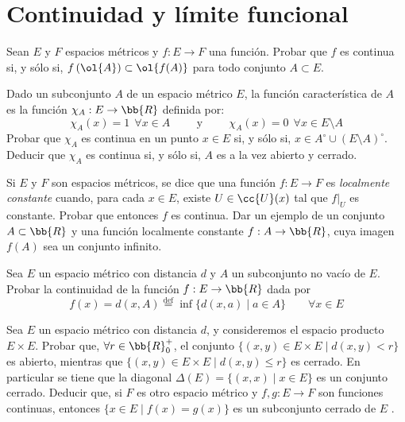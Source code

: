 \section{Continuidad y límite funcional}

\begin{ejercicio}
    Sean $E$ y $F$ espacios métricos y $f:E\to F$ una función. Probar que $f$ es continua si, y sólo si, $f\left(\ol{A}\right)\subset \ol{f(A)}$ para todo conjunto $A \subset E$.
\end{ejercicio}

\begin{ejercicio}
    Dado un subconjunto $A$ de un espacio métrico $E$, la función característica de $A$ es la función $\chi_A:E\to \bb{R}$ definida por:
    \begin{equation*}
        \chi_A(x)=1~~\forall x\in A
        \hspace{1cm} \text{y} \hspace{1cm}
        \chi_A(x)=0~~\forall x\in E\setminus A
    \end{equation*}
Probar que $\chi_A$ es continua en un punto $x\in E$ si, y sólo si, $x \in A^\circ \cup (E\setminus A)^\circ$. Deducir que $\chi_A$ es continua si, y sólo si, $A$ es a la vez abierto y cerrado.
\end{ejercicio}

\begin{ejercicio}
    Si $E$ y $F$ son espacios métricos, se dice que una función $f:E\to F$ es \emph{localmente constante} cuando, para cada $x\in E$, existe $U \in \cc{U}(x)$ tal que $f\big|_{U}$ es constante. Probar que entonces $f$ es continua. Dar un ejemplo de un conjunto $A \subset \bb{R}$ y una función localmente
    constante $f : A\to \bb{R}$, cuya imagen $f(A)$ sea un conjunto infinito.
\end{ejercicio}

\begin{ejercicio}
    Sea $E$ un espacio métrico con distancia $d$ y $A$ un subconjunto no vacío de $E$. Probar la continuidad de la función $f : E \to \bb{R}$ dada por
    \begin{equation*}
        f(x)=d(x,A)\stackrel{\text{def}}{=}\inf\{d(x,a)\mid a \in A\} \qquad \forall x\in E
    \end{equation*}
\end{ejercicio}

\begin{ejercicio}
    Sea $E$ un espacio métrico con distancia $d$, y consideremos el espacio producto $E \times E$.
    Probar que, $\forall r \in \bb{R}^+_0$, el conjunto $\{(x,y) \in E\times E \mid d(x,y) < r\}$ es abierto, mientras que $\{(x,y) \in E\times E \mid d(x,y) \leq r\}$ es cerrado.
    En particular se tiene que la diagonal $\Delta(E)=\{(x,x)\mid x\in E\}$ es un conjunto cerrado. Deducir que, si $F$ es otro espacio métrico y $f,g: E \to F$ son funciones continuas, entonces $\{x\in E\mid f(x)=g(x)\}$ es un subconjunto cerrado de $E$ .
\end{ejercicio}

